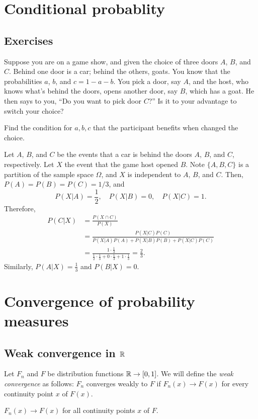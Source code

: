 \documentclass{../note}
\begin{document}
\chapter{Conditional probablity}

\section*{Exercises}

\begin{prb}
Suppose you are on a game show, and given the choice of three doors $A$, $B$, and $C$.
Behind one door is a car; behind the others, goats.
You know that the probabilities $a$, $b$, and $c=1-a-b$.
You pick a door, say $A$, and the host, who knows what's behind the doors, opens another door, say $B$, which has a goat.
He then says to you, ``Do you want to pick door $C$?''
Is it to your advantage to switch your choice?
\begin{parts}
\item Find the condition for $a,b,c$ that the participant benefits when changed the choice.
\end{parts}
\end{prb}
\begin{pf}
Let $A$, $B$, and $C$ be the events that a car is behind the doors $A$, $B$, and $C$, respectively.
Let $X$ the event that the game host opened $B$.
Note $\{A,B,C\}$ is a partition of the sample space $\Omega$, and $X$ is independent to $A$, $B$, and $C$.
Then, $P(A)=P(B)=P(C)=1/3$, and
\[P(X|A)=\frac12,\quad P(X|B)=0,\quad P(X|C)=1.\]
Therefore,
\begin{align*}
P(C|X)&=\frac{P(X\cap C)}{P(X)}\\
&=\frac{P(X|C)P(C)}{P(X|A)P(A)+P(X|B)P(B)+P(X|C)P(C)}\\
&=\frac{1\cdot \frac13}{\frac12\cdot\frac13+0\cdot\frac13+1\cdot\frac13}=\frac23.
\end{align*}
Similarly, $P(A|X)=\frac13$ and $P(B|X)=0$.
\end{pf}










\chapter{Convergence of probability measures}


\section{Weak convergence in $\mathbb{R}$}
\begin{prb}
Let $F_n$ and $F$ be distribution functions $\mathbb{R}\to[0,1]$.
We will define the \emph{weak convergence} as follows: $F_n$ converges weakly to $F$ if $F_n(x)\to F(x)$ for every continuity point $x$ of $F(x)$.
\begin{parts}
\item $F_n(x)\to F(x)$ for all continuity points $x$ of $F$.
\end{parts}
\end{prb}
\end{document}
